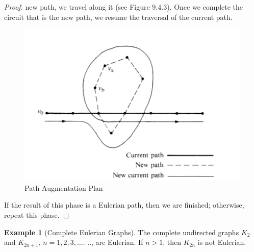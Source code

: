 \documentclass[10pt,]{book}
\theoremstyle{plain}
\theoremstyle{definition}
\theoremstyle{definition}
\theoremstyle{definition}
\newtheorem{example}[theorem]{Example}
\theoremstyle{definition}
\theoremstyle{definition}
\numberwithin{equation}{section}
\begin{document}
\begin{proof}
new path, we travel along it (see Figure 9.4.3). Once we complete the circuit that is the new path, we resume the traversal of the current path.%
\leavevmode%
\begin{figure}
\centering
\includegraphics[width=1\linewidth]{images/fig-path-augmentation.png}
\caption{Path Augmentation Plan
                \label{fig-path-augmentation}}
\end{figure}
\par
If the result of this phase is a Eulerian path, then we are finished; otherwise, repeat this phase.%
\end{proof}
\begin{example}[Complete Eulerian Graphs]\label{ex-complete-eulerian}
The complete undirected graphs \(K_2\) and \(K_{2n+1}\), \(n = 1, 2, 3, \ldots\). .., are Eulerian. If \(n>1\), then \(K_{2n}\)
is not Eulerian.
%
\end{example}
\typeout{************************************************}
\typeout{************************************************}
\end{document}
